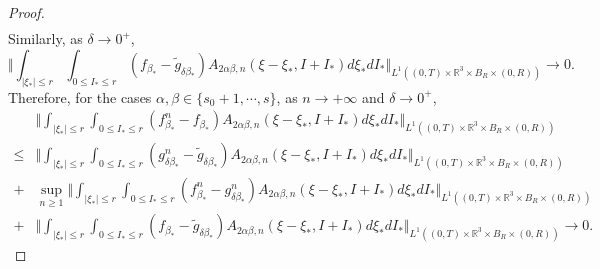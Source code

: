 \documentclass[10pt,a4paper]{amsart}
\def\R{\mathbb{R}}
\def\no{\nonumber}
\begin{document}
\begin{proof}
\begin{equation*}
\begin{aligned}
  \end{aligned}
\end{equation*}
Similarly, as $\delta \to 0^+$,
\begin{equation*}
	\Vert \int_{|\xi_* |\leq r} \int_{0\leq I_* \leq r} (f_{ \beta_*} -\tilde{g}_{\delta \beta_*}) A_{2\alpha \beta ,n}(\xi -\xi_* ,I+I_* ) d\xi_* dI_* \Vert_{L^1((0,T)\times \R^3 \times B_R \times (0,R))} \rightarrow  0.
\end{equation*}
Therefore, for the cases $ \alpha, \beta \in \{ s_0 + 1, \cdots, s \} $, as $n \rightarrow + \infty $ and $ \delta \rightarrow 0^+$,
	\begin{align}\label{K1}
		\no &\Vert \int_{|\xi_* |\leq r} \int_{0\leq I_* \leq r} (f^n_{ \beta_*}-f_{\beta_*}) A_{2\alpha \beta ,n}(\xi -\xi_* ,I+I_* ) d\xi_* dI_*  \Vert_{L^1((0,T)\times \R^3 \times B_R \times (0,R))} \\
		\no \leq & \Vert \int_{|\xi_* |\leq r} \int_{0\leq I_* \leq r} (g^n_{\delta \beta_*}-\tilde{g}_{\delta \beta_*}) A_{2\alpha \beta ,n} (\xi -\xi_* ,I+I_* )d\xi_* dI_* \Vert_{L^1((0,T)\times \R^3 \times B_R \times (0,R))} \\
		\no + & \sup_{n \geq 1} \Vert \int_{|\xi_* |\leq r} \int_{0\leq I_* \leq r} (f^n_{ \beta_*} -g^n_{\delta \beta_*}) A_{2\alpha \beta ,n} (\xi -\xi_* ,I+I_* )d\xi_* dI_* \Vert_{L^1((0,T)\times \R^3 \times B_R \times (0,R))} \\
		+ &\Vert \int_{|\xi_* |\leq r} \int_{0\leq I_* \leq r} (f_{\beta_*} -\tilde{g}_{\delta \beta_*}) A_{2\alpha \beta,n }(\xi -\xi_* ,I+I_* ) d\xi_* dI_* \Vert_{L^1((0,T)\times \R^3 \times B_R \times (0,R))} \rightarrow 0.
	\end{align}


\end{proof}
\end{document}
